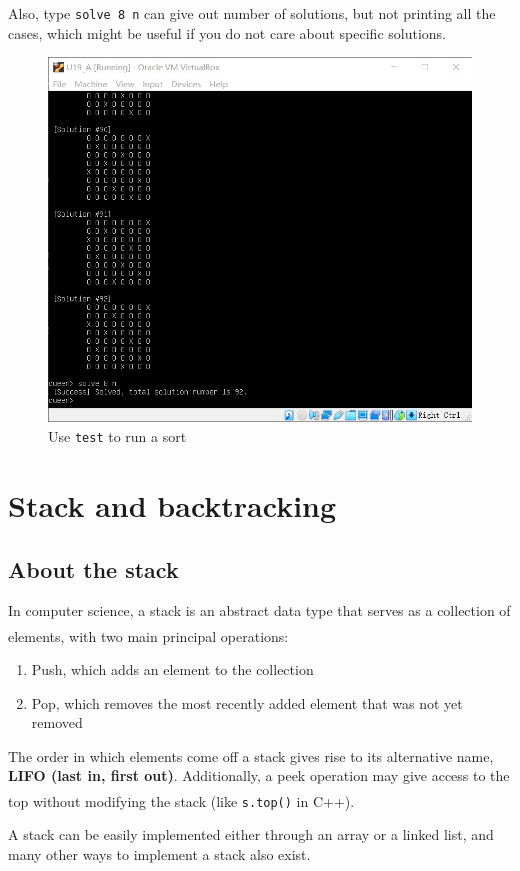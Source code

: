 \documentclass[cn,black,12pt,normal]{elegantnote}
\newcommand{\uct}[1]{\textsuperscript{\textsuperscript{\cite{#1}}}}
\begin{document}
Also, type \lstinline{solve 8 n} can give out number of solutions, but not printing all the cases, which might be useful if you do not care about specific solutions.

\begin{figure}[H]
    \centering
    \includegraphics[width=0.7\linewidth]{image/queen_02.jpg}
    \caption{Use \lstinline{test} to run a sort}
\end{figure}

\section{Stack and backtracking}

\subsection{About the stack}

In computer science, a stack is an abstract data type that serves as a collection of elements, with two main principal operations\uct{wiki:Stack_(abstract_data_type)}:
\begin{enumerate}
    \item Push, which adds an element to the collection
    \item Pop, which removes the most recently added element that was not yet removed
\end{enumerate}

The order in which elements come off a stack gives rise to its alternative name, \textbf{LIFO (last in, first out)}. Additionally, a peek operation may give access to the top without modifying the stack (like \lstinline{s.top()} in C++).\uct{wiki:Stack_(abstract_data_type)}

A stack can be easily implemented either through an array or a linked list, and many other ways to implement a stack also exist.
\end{document}
